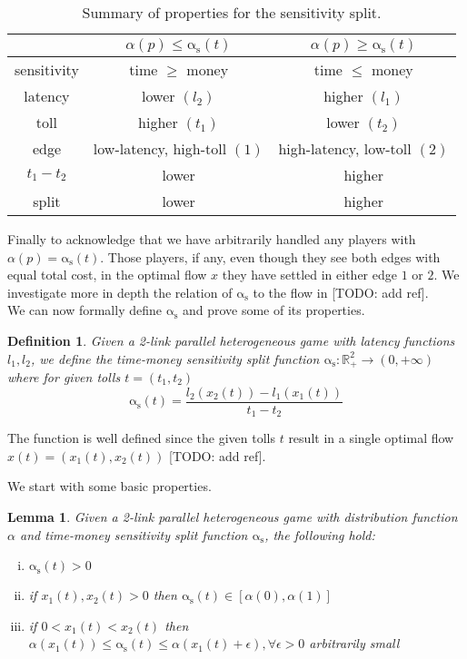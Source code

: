 \documentclass[a4paper,11pt]{article}
\newcommand{\as}{\mathrm{\alpha_s}}
\newcommand{\R}{\mathbb{R}}
\newtheorem{definition}{Definition}[section]
\newtheorem{lemma}{Lemma}[section]
\begin{document}
\begin{table}[h!]
	\centering
	\caption{Summary of properties for the sensitivity split.}
	\begin{tabular}{| c || c | c |}
		\hline
		& $\alpha(p) \le \as(t)$ & $\alpha(p) \ge \as(t)$ \\ \hline
		sensitivity & time $\ge$ money & time $\le$ money \\ \hline
		latency & lower $(l_2)$ & higher $(l_1)$ \\ \hline
		toll & higher $(t_1)$ & lower $(t_2)$ \\ \hline
		edge & low-latency, high-toll $(1)$ & high-latency, low-toll $(2)$ \\ \hline
		$t_1 - t_2$ & lower & higher \\ \hline
		split & lower & higher \\ \hline
	\end{tabular}
	\label{table:split_summary}
\end{table}

Finally to acknowledge that we have arbitrarily handled any players with $\alpha(p) = \as(t)$.
Those players, if any, even though they see both edges with equal total cost, in the optimal flow $x$ they have settled in either edge $1$ or $2$.
We investigate more in depth the relation of $\as$ to the flow in [TODO: add ref].
\\[12pt]
We can now formally define $\as$ and prove some of its properties.
\begin{definition}
	Given a 2-link parallel heterogeneous game with latency functions $l_1, l_2$, we define the time-money sensitivity split function $\as: \R^2_+ \rightarrow (0, +\infty)$ where for given tolls $t = (t_1, t_2)$
	\[\as(t) = \frac{l_2(x_2(t)) - l_1(x_1(t))}{t_1 - t_2}\]
\end{definition}
The function is well defined since the given tolls $t$ result in a single optimal flow $x(t) = (x_1(t), x_2(t))$ [TODO: add ref].

We start with some basic properties.
\begin{lemma}
	\label{lemma:split_basic}
	Given a 2-link parallel heterogeneous game with distribution function $\alpha$ and time-money sensitivity split function $\as$, the following hold:
	\begin{enumerate}[(i)]
		\item $\as(t) > 0$
		\item if $x_1(t), x_2(t) > 0$ then $\as(t) \in [\alpha(0), \alpha(1)]$
		\item if $0 < x_1(t) < x_2(t)$ then $\alpha(x_1(t)) \le \as(t) \le \alpha(x_1(t) + \epsilon), \forall \epsilon > 0$ arbitrarily small
	\end{enumerate}
\end{lemma}
\end{document}
